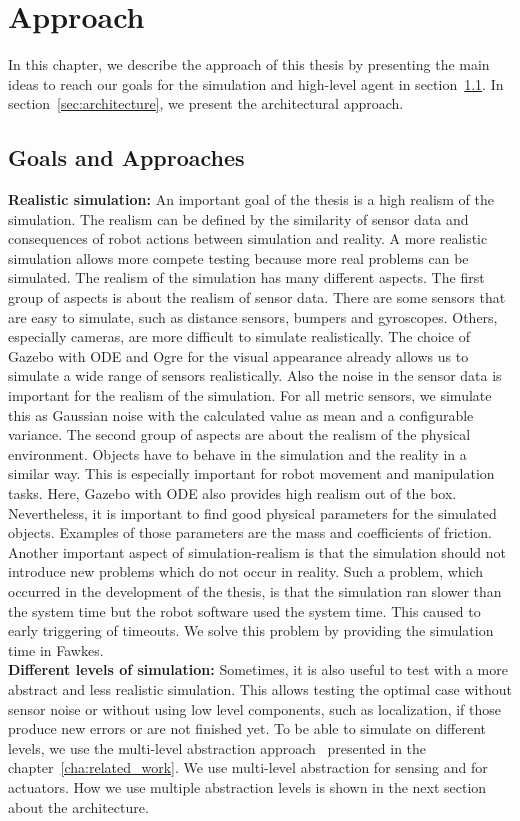 \chapter{Approach}
\label{cha:approach}
In this chapter, we describe the approach of this thesis by presenting the main ideas to reach our goals for the simulation and high-level agent in section~\ref{sec:goals_and_approaches}. In section~\ref{sec:architecture}, we present the architectural approach.

\section{Goals and Approaches}
\label{sec:goals_and_approaches}
\textbf{Realistic simulation:} An important goal of the thesis is a high realism of the simulation. The realism can be defined by the similarity of sensor data and consequences of robot actions between simulation and reality. A more realistic simulation allows more compete testing because more real problems can be simulated. The realism of the simulation has many different aspects. The first group of aspects is about the realism of sensor data. There are some sensors that are easy to simulate, such as distance sensors, bumpers and gyroscopes. Others, especially cameras, are more difficult to simulate realistically. The choice of Gazebo with ODE and Ogre for the visual appearance already allows us to simulate a wide range of sensors realistically. Also the noise in the sensor data is important for the realism of the simulation. For all metric sensors, we simulate this as Gaussian noise with the calculated value as mean and a configurable variance. The second group of aspects are about the realism of the physical environment. Objects have to behave in the simulation and the reality in a similar way. This is especially important for robot movement and manipulation tasks. Here, Gazebo with ODE also provides high realism out of the box. Nevertheless, it is important to find good physical parameters for the simulated objects. Examples of those parameters are the mass and coefficients of friction. Another important aspect of simulation-realism is that the simulation should not introduce new problems which do not occur in reality. Such a problem, which occurred in the development of the thesis, is that the simulation ran slower than the system time but the robot software used the system time. This caused to early triggering of timeouts. We solve this problem by providing the simulation time in Fawkes.\\
\textbf{Different levels of simulation:} Sometimes, it is also useful to test with a more abstract and less realistic simulation. This allows testing the optimal case without sensor noise or without using low level components, such as localization, if those produce new errors or are not finished yet. To be able to simulate on different levels, we use the multi-level abstraction approach~\cite{MultiLevelAbstraction} presented in the chapter~\ref{cha:related_work}. We use multi-level abstraction for sensing and for actuators. How we use multiple abstraction levels is shown in the next section about the architecture.\\
